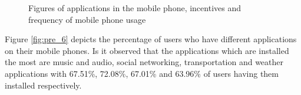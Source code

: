 \begin{figure}[htp]
\hspace{1em}
\newline
\centering
{}

\caption{Figures of applications in the mobile phone, incentives and frequency of mobile phone usage}
\label{fig:s3}
\end{figure}

Figure \ref{fig:pre_6} depicts the percentage of users who have different applications on their mobile phones. Is it observed that the applications which are installed the most are music and audio, social networking, transportation and weather applications with 67.51\%, 72.08\%, 67.01\% and 63.96\% of users having them installed respectively.


